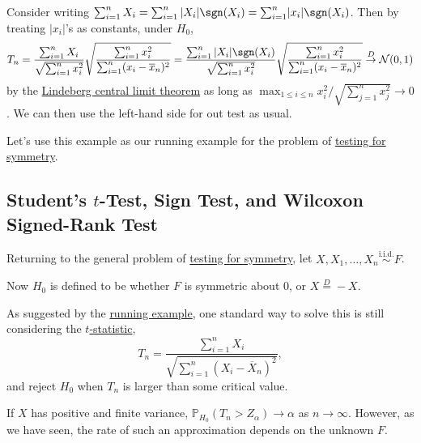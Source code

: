 \begin{eg}\label{eg:two-sample-t-statistic}
	Consider writing \(\sum_{i=1}^{n} X_i = \sum_{i=1}^{n} \vert X_i \vert \sgn (X_i) = \sum_{i=1}^{n} \lvert x_i \rvert \sgn (X_i)\). Then by treating \(\vert x_i \vert \)'s as constants, under \(H_0\),
	\begin{equation}\label{eq:two-sample}
		T_n
		= \frac{\sum_{i=1}^{n} X_i}{\sqrt{\sum_{i=1}^{n} x_i^2} } \sqrt{\frac{\sum_{i=1}^{n} x_i^2}{\sum_{i=1}^{n} (x_i - \overline{x} _n)^2}}
		= \frac{\sum_{i=1}^{n} \vert X_i \vert \sgn (X_i)}{\sqrt{\sum_{i=1}^{n} x_i^2} }\sqrt{\frac{\sum_{i=1}^{n} x_i^2}{\sum_{i=1}^{n} (x_i - \overline{x} _n)^2}}
		\overset{D}{\to} \mathcal{N} (0, 1)
	\end{equation}
	by the \hyperref[thm:Lindeberg-CLT]{Lindeberg central limit theorem} as long as \(\max _{1 \leq i \leq n} x_i^2 / \sqrt{\sum_{j=1}^{n} x_j^2} \to 0\). We can then use the left-hand side for out test as usual.
\end{eg}

Let's use this example as our running example for the problem of \hyperref[prb:testing-symmetry]{testing for symmetry}.

\subsection{Student's \(t\)-Test, Sign Test, and Wilcoxon Signed-Rank Test}
Returning to the general problem of \hyperref[prb:testing-symmetry]{testing for symmetry}, let \(X, X_1, \dots , X_n \overset{\text{i.i.d.} }{\sim } F\).

\begin{prev}
	Now \(H_0\) is defined to be whether \(F\) is symmetric about \(0\), or \(X \overset{D}{=} -X\).
\end{prev}

As suggested by the \hyperref[eg:two-sample-t-statistic]{running example}, one standard way to solve this is still considering the \hyperref[def:t-statistic]{\(t\)-statistic},
\[
	T_n
	= \frac{\sum_{i=1}^{n} X_i}{\sqrt{\sum_{i=1}^{n} (X_i - \overline{X} _n)^2} },
\]
and reject \(H_0\) when \(T_n\) is larger than some critical value.

\begin{prev}
	If \(X\) has positive and finite variance, \(\mathbb{P} _{H_0}(T_n > Z_\alpha ) \to \alpha \) as \(n \to \infty \). However, as we have seen, the rate of such an approximation depends on the unknown \(F\).
\end{prev}


